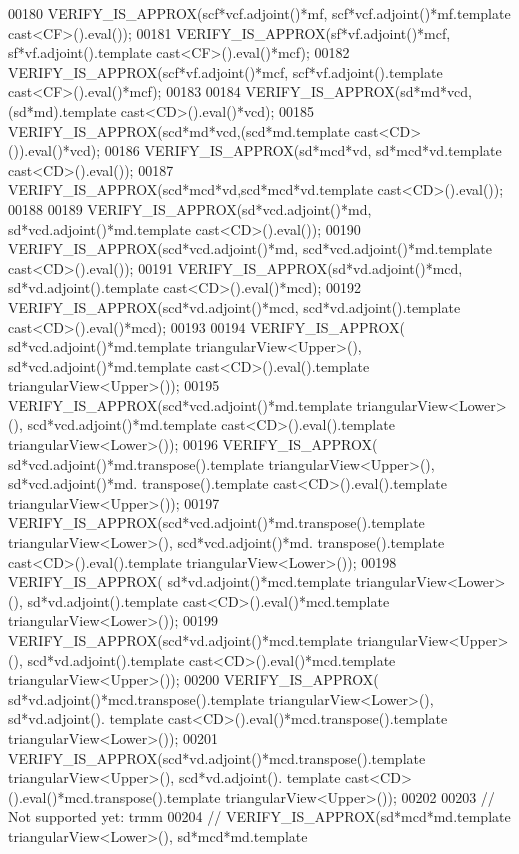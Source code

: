 \begin{DoxyCode}
00180   VERIFY\_IS\_APPROX(scf*vcf.adjoint()*mf, scf*vcf.adjoint()*mf.template cast<CF>().eval());
00181   VERIFY\_IS\_APPROX(sf*vf.adjoint()*mcf,  sf*vf.adjoint().template cast<CF>().eval()*mcf);
00182   VERIFY\_IS\_APPROX(scf*vf.adjoint()*mcf, scf*vf.adjoint().template cast<CF>().eval()*mcf);
00183 
00184   VERIFY\_IS\_APPROX(sd*md*vcd, (sd*md).\textcolor{keyword}{template} cast<CD>().eval()*vcd);
00185   VERIFY\_IS\_APPROX(scd*md*vcd,(scd*md.template cast<CD>()).eval()*vcd);
00186   VERIFY\_IS\_APPROX(sd*mcd*vd, sd*mcd*vd.template cast<CD>().eval());
00187   VERIFY\_IS\_APPROX(scd*mcd*vd,scd*mcd*vd.template cast<CD>().eval());
00188 
00189   VERIFY\_IS\_APPROX(sd*vcd.adjoint()*md,  sd*vcd.adjoint()*md.template cast<CD>().eval());
00190   VERIFY\_IS\_APPROX(scd*vcd.adjoint()*md, scd*vcd.adjoint()*md.template cast<CD>().eval());
00191   VERIFY\_IS\_APPROX(sd*vd.adjoint()*mcd,  sd*vd.adjoint().template cast<CD>().eval()*mcd);
00192   VERIFY\_IS\_APPROX(scd*vd.adjoint()*mcd, scd*vd.adjoint().template cast<CD>().eval()*mcd);
00193 
00194   VERIFY\_IS\_APPROX( sd*vcd.adjoint()*md.template triangularView<Upper>(),  sd*vcd.adjoint()*md.template 
      cast<CD>().eval().template triangularView<Upper>());
00195   VERIFY\_IS\_APPROX(scd*vcd.adjoint()*md.template triangularView<Lower>(), scd*vcd.adjoint()*md.template 
      cast<CD>().eval().template triangularView<Lower>());
00196   VERIFY\_IS\_APPROX( sd*vcd.adjoint()*md.transpose().template triangularView<Upper>(),  sd*vcd.adjoint()*md.
      transpose().template cast<CD>().eval().template triangularView<Upper>());
00197   VERIFY\_IS\_APPROX(scd*vcd.adjoint()*md.transpose().template triangularView<Lower>(), scd*vcd.adjoint()*md.
      transpose().template cast<CD>().eval().template triangularView<Lower>());
00198   VERIFY\_IS\_APPROX( sd*vd.adjoint()*mcd.template triangularView<Lower>(),  sd*vd.adjoint().template 
      cast<CD>().eval()*mcd.template triangularView<Lower>());
00199   VERIFY\_IS\_APPROX(scd*vd.adjoint()*mcd.template triangularView<Upper>(), scd*vd.adjoint().template 
      cast<CD>().eval()*mcd.template triangularView<Upper>());
00200   VERIFY\_IS\_APPROX( sd*vd.adjoint()*mcd.transpose().template triangularView<Lower>(),  sd*vd.adjoint().
      template cast<CD>().eval()*mcd.transpose().template triangularView<Lower>());
00201   VERIFY\_IS\_APPROX(scd*vd.adjoint()*mcd.transpose().template triangularView<Upper>(), scd*vd.adjoint().
      template cast<CD>().eval()*mcd.transpose().template triangularView<Upper>());
00202 
00203   \textcolor{comment}{// Not supported yet: trmm}
00204 \textcolor{comment}{//   VERIFY\_IS\_APPROX(sd*mcd*md.template triangularView<Lower>(),  sd*mcd*md.template
}
\end{DoxyCode}
